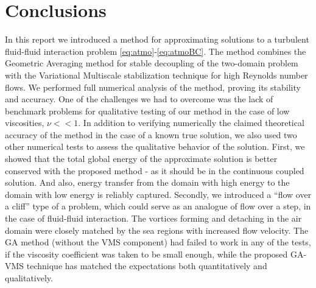 \documentclass[10pt]{article}%
\numberwithin{equation}{section}
\begin{document}
\section{Conclusions}

In this report we introduced a method for approximating solutions to a turbulent fluid-fluid interaction problem \eqref{eq:atmo}-\eqref{eq:atmoBC}. The method combines the Geometric Averaging method for stable decoupling of the two-domain problem with the Variational Multiscale stabilization technique for high Reynolds number flows. We performed full numerical analysis of the method, proving its stability and accuracy. One of the challenges we had to overcome was the lack of benchmark problems for qualitative testing of our method in the case of low viscosities, $\nu << 1$. In addition to verifying numerically the claimed theoretical accuracy of the method in the case of a known true solution, we also used two other numerical tests to assess the qualitative behavior of the solution. First, we showed that the total global energy of the approximate solution is better conserved with the proposed method - as it should be in the continuous coupled solution. And also, energy transfer from the domain with high energy to the domain with low energy is reliably captured. Secondly, we introduced a ``flow over a cliff'' type of a problem, which could serve as an analogue of flow over a step, in the case of fluid-fluid interaction. The vortices forming and detaching in the air domain were closely matched by the sea regions with increased flow velocity. The GA method (without the VMS component) had failed to work in any of the tests, if the viscosity coefficient was taken to be small enough, while the proposed GA-VMS technique has matched the expectations both quantitatively and qualitatively.




\end{document}
